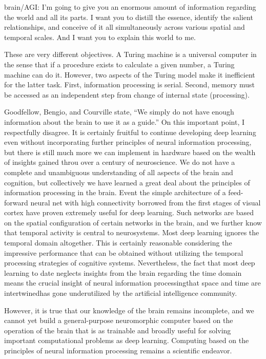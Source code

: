 brain/AGI: I'm going to give you an enormous amount of information regarding the world and all its parts. I want you to distill the essence, identify the salient relationships, and conceive of it all simultaneously across various spatial and temporal scales. And I want you to explain this world to me.

These are very different objectives. A Turing machine is a universal computer in the sense that if a procedure exists to calculate a given number, a Turing machine can do it. However, two aspects of the Turing model make it inefficient for the latter task. First, information processing is serial. Second, memory must be accessed as an independent step from change of internal state (processing).

\vspace{3em}
Goodfellow, Bengio, and Courville state, ``We simply do not have enough information about the brain to use it as a guide.'' On this important point, I respectfully disagree. It is certainly fruitful to continue developing deep learning even without incorporating further principles  of neural information processing, but there is still much more we can implement in hardware based on the wealth of insights gained throu over a century of neuroscience. We do not have a complete and unambiguous understanding of all aspects of the brain and cognition, but collectively we have learned a great deal about the principles of information processing in the brain. Event the simple architecture of a feed-forward neural net with high connectivity borrowed from the first stages of visual cortex have proven extremely useful for deep learning. Such networks are based on the spatial configuration of certain networks in the brain, and we further know that temporal activity is central to neurosystems. Most deep learning ignores the temporal domain altogether. This is certainly reasonable considering the impressive performance that can be obtained without utilizing the temporal processing strategies of cognitive systems. Nevertheless, the fact that most deep learning to date neglects insights from the brain regarding the time domain means the crucial insight of neural information processing\textemdash that space and time are intertwined\textemdash has gone underutilized by the artificial intelligence community. 

However, it is true that our knowledge of the brain remains incomplete, and we cannot yet build a general-purpose neuromorphic computer based on the operation of the brain that is as trainable and broadly useful for solving important computational problems as deep learning. Computing based on the principles of neural information processing remains a scientific endeavor. 

